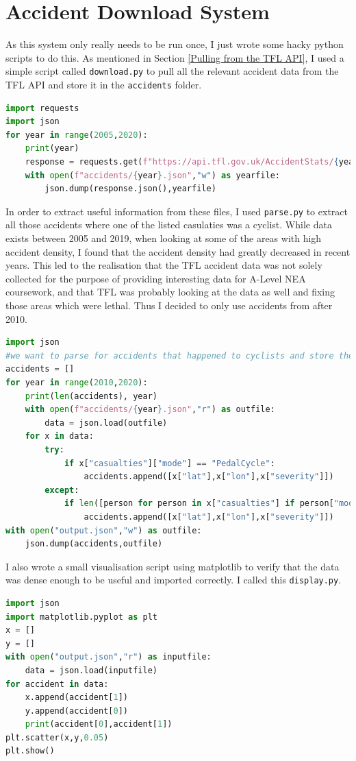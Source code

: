 \documentclass[11pt,twoside,a4paper]{report}
\begin{document}
\section{Accident Download System}
\label{Accident Download System Implementation}
As this system only really needs to be run once, I just wrote some hacky python scripts to do this.
As mentioned in Section \ref{Pulling from the TFL API}, I used a simple script called \texttt{download.py} to pull all the relevant accident data from the TFL API and store it in the \texttt{accidents} folder.
\begin{lstlisting}[language=python]
import requests
import json
for year in range(2005,2020):
    print(year)
    response = requests.get(f"https://api.tfl.gov.uk/AccidentStats/{year}")
    with open(f"accidents/{year}.json","w") as yearfile:
        json.dump(response.json(),yearfile)
\end{lstlisting}
In order to extract useful information from these files, I used \texttt{parse.py} to extract all those accidents where one of the listed casulaties was a cyclist. While data exists between 2005 and 2019,
when looking at some of the areas with high accident density, I found that the accident density had greatly decreased in recent years. This led to the realisation that the TFL accident data was not solely collected 
for the purpose of providing interesting data for A-Level NEA coursework, and that TFL was probably looking at the data as well and fixing those areas which were lethal. Thus I decided to only use accidents from after 2010.
\begin{lstlisting}[language=python]
import json
#we want to parse for accidents that happened to cyclists and store the severity and the location
accidents = []
for year in range(2010,2020):
    print(len(accidents), year)
    with open(f"accidents/{year}.json","r") as outfile:
        data = json.load(outfile)
    for x in data:
        try:
            if x["casualties"]["mode"] == "PedalCycle":
                accidents.append([x["lat"],x["lon"],x["severity"]])
        except:
            if len([person for person in x["casualties"] if person["mode"] == "PedalCycle"]) >= 1:
                accidents.append([x["lat"],x["lon"],x["severity"]])
with open("output.json","w") as outfile:
    json.dump(accidents,outfile)
\end{lstlisting}
I also wrote a small visualisation script using matplotlib to verify that the data was dense enough to be useful and imported correctly. I called this \texttt{display.py}. 
\begin{lstlisting}[language=python]
import json
import matplotlib.pyplot as plt
x = []
y = []
with open("output.json","r") as inputfile:
    data = json.load(inputfile)
for accident in data:
    x.append(accident[1])
    y.append(accident[0])
    print(accident[0],accident[1])
plt.scatter(x,y,0.05)
plt.show()
\end{lstlisting}
\end{document}

